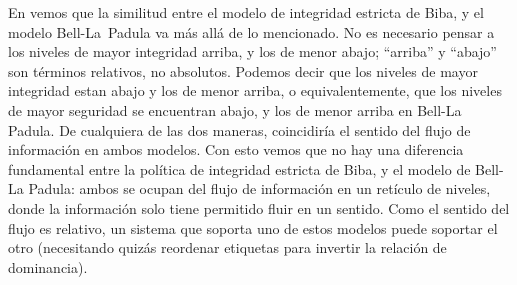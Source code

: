 \documentclass[spanish]{article}
\theoremstyle{definition}
\begin{document}
En \cite{Sandhu93} vemos que la similitud entre el modelo de integridad estricta
de Biba, y el modelo Bell-La~Padula va más allá de lo mencionado. No es
necesario pensar a los niveles de mayor integridad arriba, y los de menor abajo;
``arriba'' y ``abajo'' son términos relativos, no absolutos. Podemos decir que
los niveles de mayor integridad estan abajo y los de menor arriba, o
equivalentemente, que los niveles de mayor seguridad se encuentran abajo, y los
de menor arriba en Bell-La Padula. De cualquiera de las dos maneras,
coincidiría el sentido del flujo de información en ambos modelos. Con esto vemos
que no hay una diferencia fundamental entre la política de integridad estricta
de Biba, y el modelo de Bell-La Padula: ambos se ocupan del flujo de información
en un retículo de niveles, donde la información solo tiene permitido fluir en un
sentido. Como el sentido del flujo es relativo, un sistema que soporta uno de
estos modelos puede soportar el otro (necesitando quizás reordenar etiquetas
para invertir la relación de dominancia).

%



\end{document}
